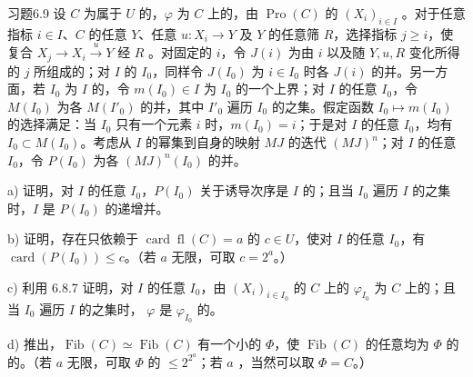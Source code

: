 \begin{SGAresult}{习题}{6.9}
设 $C$ 为属于 $U$ 的，$\varphi$ 为 $C$ 上的，由 $\operatorname{Pro}(C)$ 的 $(X_i)_{i\in I}$ 。对于任意指标 $i\in I$、$C$ 的任意 $Y$、任意 $u:X_i\to Y$ 及 $Y$ 的任意筛 $R$，选择指标 $j\geq i$，使复合 $X_j\to X_i\xrightarrow uY$ 经 $R$ 。对固定的 $i$，令 $J(i)$ 为由 $i$ 以及随 $Y,u,R$ 变化所得的 $j$ 所组成的；对 $I$ 的 $I_0$，同样令 $J(I_0)$ 为 $i\in I_0$ 时各 $J(i)$ 的并。另一方面，若 $I_0$ 为 $I$ 的，令 $m(I_0)\in I$ 为 $I_0$ 的一个上界；对 $I$ 的任意 $I_0$，令 $M(I_0)$ 为各 $M(I'_0)$ 的并，其中 $I'_0$ 遍历 $I_0$ 的之集。假定函数 $I_0\mapsto m(I_0)$ 的选择满足：当 $I_0$ 只有一个元素 $i$ 时，$m(I_0)=i$；于是对 $I$ 的任意 $I_0$，均有 $I_0\subset M(I_0)$。考虑从 $I$ 的幂集到自身的映射 $MJ$ 的迭代 $(MJ)^n$；对 $I$ 的任意 $I_0$，令 $P(I_0)$ 为各 $(MJ)^n(I_0)$ 的并。

 a) 证明，对 $I$ 的任意 $I_0$，$P(I_0)$ 关于诱导次序是 $I$ 的；且当 $I_0$ 遍历 $I$ 的之集时，$I$ 是 $P(I_0)$ 的递增并。

 b) 证明，存在只依赖于 $\operatorname{card}\operatorname{fl}(C)=a$ 的 $c\in U$，使对 $I$ 的任意 $I_0$，有 $\operatorname{card}(P(I_0))\leq c$。（若 $a$ 无限，可取 $c=2^a$。）

 c) 利用 6.8.7 证明，对 $I$ 的任意 $I_0$，由 $(X_i)_{i\in I_0}$ 的 $C$ 上的 $\varphi_{I_0}$ 为 $C$ 上的；且当 $I_0$ 遍历 $I$ 的之集时， $\varphi$ 是 $\varphi_{I_0}$ 的。

 d) 推出，$\operatorname{Fib}(C)\simeq\operatorname{Fib}(C)$ 有一个小的 $\Phi$，使 $\operatorname{Fib}(C)$ 的任意均为 $\Phi$ 的的。（若 $a$ 无限，可取 $\Phi$ 的 $\leq2^{2^a}$；若 $a$ ，当然可以取 $\Phi=C$。）
\end{SGAresult}


